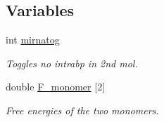 \subsection*{Variables}
\begin{DoxyCompactItemize}
\item 
\mbox{\label{group__pf__cofold_gaff27888c4088cc1f60fd59cbd589474c}} 
int \hyperlink{group__pf__cofold_gaff27888c4088cc1f60fd59cbd589474c}{mirnatog}
\begin{DoxyCompactList}\small\item\em Toggles no intrabp in 2nd mol. \end{DoxyCompactList}\item 
\mbox{\label{group__pf__cofold_gac2d1851a710a8561390861155ca988fe}} 
double \hyperlink{group__pf__cofold_gac2d1851a710a8561390861155ca988fe}{F\+\_\+monomer} \mbox{[}2\mbox{]}
\begin{DoxyCompactList}\small\item\em Free energies of the two monomers. \end{DoxyCompactList}\end{DoxyCompactItemize}
